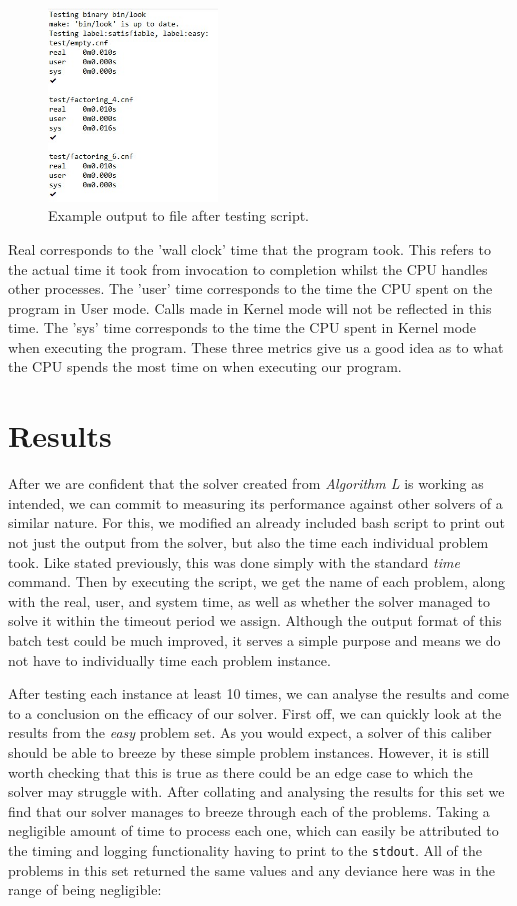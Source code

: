 \documentclass{article}
\begin{document}
\begin{figure}[h]
    \centering
    \includegraphics[width=0.4\textwidth]{file_example.jpg}
    \caption{Example output to file after testing script.}
\end{figure}

Real corresponds to the 'wall clock' time that the program took. This refers to the actual time it took from invocation 
to completion whilst the CPU handles other processes. The 'user' time corresponds to the time the CPU spent on the program in 
User mode. Calls made in Kernel mode will not be reflected in this time. The 'sys' time corresponds to the time the CPU spent in 
Kernel mode when executing the program. These three metrics give us a good idea as to what the CPU spends the most time on when 
executing our program.

\section{Results}
After we are confident that the solver created from \textit{Algorithm L} is working as intended, we can commit to measuring its
performance against other solvers of a similar nature. For this, we modified an already included bash script to print out not just
the output from the solver, but also the time each individual problem took. Like stated previously, this was done simply with the
standard \textit{time} command. Then by executing the script, we get the name of each problem, along with the real, user, and
system time, as well as whether the solver managed to solve it within the timeout period we assign. Although the output format of
this batch test could be much improved, it serves a simple purpose and means we do not have to individually time each problem
instance.

After testing each instance at least 10 times, we can analyse the results and come to a conclusion on the efficacy of our solver.
First off, we can quickly look at the results from the \textit{easy} problem set. As you would expect, a solver of this caliber
should be able to breeze by these simple problem instances. However, it is still worth checking that this is true as there could
be an edge case to which the solver may struggle with. After collating and analysing the results for this set we find that our
solver manages to breeze through each of the problems. Taking a negligible amount of time to process each one, which can easily be
attributed to the timing and logging functionality having to print to the \texttt{stdout}. All of the problems in this set
returned the same values and any deviance here was in the range of being negligible:
\end{document}
